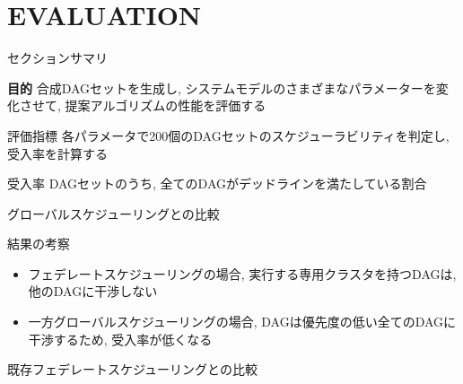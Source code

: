 
\section{EVALUATION}
\label{sec: evaluation}

\begin{frame}{セクションサマリ}
    \begin{itembox}[l]{\textbf{目的}}
        合成DAGセットを生成し, システムモデルのさまざまなパラメーターを変化させて, 提案アルゴリズムの性能を評価する
    \end{itembox}
\end{frame}

\begin{frame}{評価指標}
    各パラメータで200個のDAGセットのスケジューラビリティを判定し, 受入率を計算する
    \begin{block}{受入率}
        DAGセットのうち, 全てのDAGがデッドラインを満たしている割合
    \end{block}
\end{frame}

\begin{frame}{グローバルスケジューリングとの比較}
\end{frame}

\begin{frame}{結果の考察}
    \begin{itemize}
        \item フェデレートスケジューリングの場合, 実行する専用クラスタを持つDAGは, 他のDAGに干渉しない
        \item 一方グローバルスケジューリングの場合, DAGは優先度の低い全てのDAGに干渉するため, 受入率が低くなる
    \end{itemize}
\end{frame}

\begin{frame}{既存フェデレートスケジューリングとの比較}
\end{frame}
